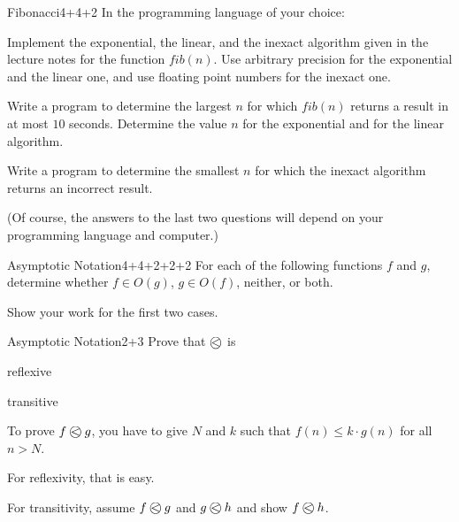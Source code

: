 \documentclass[a4paper]{article}
\begin{document}
\header

\begin{problem}{Fibonacci}{4+4+2}
In the programming language of your choice:

\begin{compactenum}
 \item Implement the exponential, the linear, and the inexact algorithm given in the lecture notes for the function $fib(n)$.
 Use arbitrary precision for the exponential and the linear one, and use floating point numbers for the inexact one.
 \item Write a program to determine the largest $n$ for which $fib(n)$ returns a result in at most $10$ seconds.
  Determine the value $n$ for the exponential and for the linear algorithm.
 \item Write a program to determine the smallest $n$ for which the inexact algorithm returns an incorrect result.
\end{compactenum}

(Of course, the answers to the last two questions will depend on your programming language and computer.)
\end{problem}

\begin{problem}{Asymptotic Notation}{4+4+2+2+2}
For each of the following functions $f$ and $g$, determine whether $f\in O(g)$, $g\in O(f)$, neither, or both.

\begin{compactenum}
 \item
 \item 
 \item
 \item
 \item
\end{compactenum}

Show your work for the first two cases.
\end{problem}

\begin{problem}{Asymptotic Notation}{2+3}
Prove that $\Oleq{}{}$ is
\begin{compactenum}
 \item reflexive
 \item transitive
\end{compactenum}

\begin{hint}
To prove $\Oleq{f}{g}$, you have to give $N$ and $k$ such that $f(n)\leq k\cdot g(n)$ for all $n>N$.

For reflexivity, that is easy.

For transitivity, assume $\Oleq{f}{g}$ and $\Oleq{g}{h}$ and show $\Oleq{f}{h}$.
\end{hint}
\end{problem}
\end{document}
